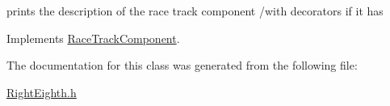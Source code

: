 prints the description of the race track component /with decorators if it has 

Implements \mbox{\hyperlink{class_race_track_component_a02a8d9520cfd80f31dd94b5fa1e76d47}{Race\+Track\+Component}}.



The documentation for this class was generated from the following file\+:\begin{DoxyCompactItemize}
\item 
\mbox{\hyperlink{_right_eighth_8h}{Right\+Eighth.\+h}}\end{DoxyCompactItemize}
